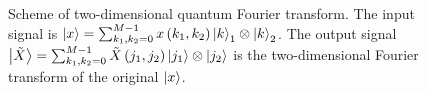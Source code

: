 \begin{figure}
\centering



\caption{Scheme of two-dimensional quantum Fourier transform. The input
  signal is $\ket{x} = \sum_{k_1,k_2=0}^{M-1} x\left(k_1,
  k_2\right)\ket{k}_1 \otimes \ket{k}_2$. The output signal $\ket{\tilde{X}} = \sum_{k_1,k_2=0}^{M-1} \tilde{X}\left(j_1,
  j_2\right) \ket{j_1} \otimes \ket{j_2}$ is the two-dimensional
  Fourier transform of 
  the original $\ket{x}$.}
\label{figQuantCompQuantFourier2d}
\end{figure}